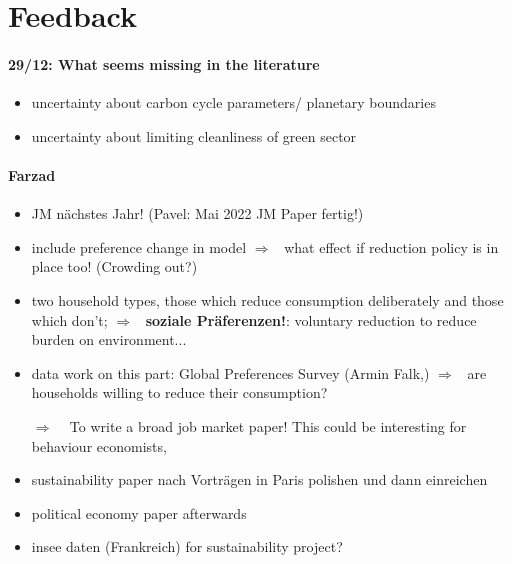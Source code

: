 \documentclass[12pt]{article}
\newcommand{\ar}{$\Rightarrow$ \ }
\begin{document}
\section{Feedback}
\paragraph{29/12: What seems missing in the literature}
\begin{itemize}
\item uncertainty about carbon cycle parameters/ planetary boundaries
\item uncertainty about limiting cleanliness of green sector
\end{itemize}
\paragraph{Farzad}
\begin{itemize}
\item JM nächstes Jahr! (Pavel: Mai 2022 JM Paper fertig!)
\item include preference change in model \ar what effect if reduction policy is in place too!  (Crowding out?)
\item two household types, those which reduce consumption deliberately and those which don't; \ar \textbf{soziale Präferenzen!}: voluntary reduction to reduce burden on environment...
\item data work on this part: Global Preferences Survey (Armin Falk,) \ar are households willing to reduce their consumption?
\item[\ar] To write a broad job market paper! This could be interesting for behaviour economists, 
\item sustainability paper nach Vorträgen in Paris polishen und dann einreichen
\item  political economy paper afterwards
\item insee daten (Frankreich) for sustainability project?
\end{itemize}
\clearpage

\end{document}

